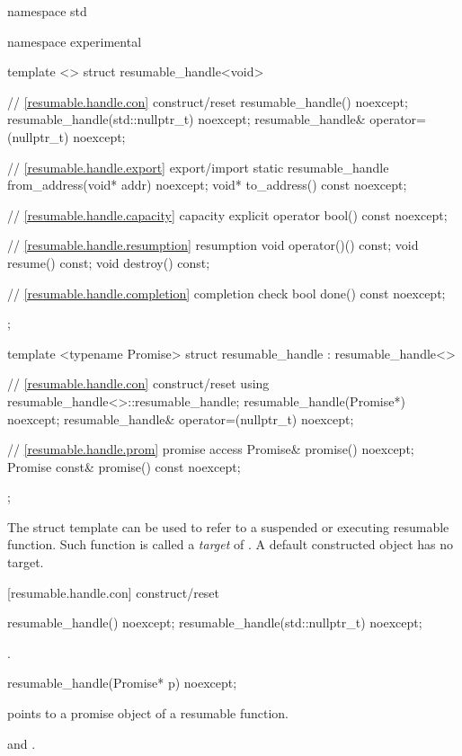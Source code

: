 %
\begin{codeblock}
namespace std {
  namespace experimental {
    template <>
    struct resumable_handle<void>
    {
      // \ref{resumable.handle.con} construct/reset
      resumable_handle() noexcept;		
      resumable_handle(std::nullptr_t) noexcept;
      resumable_handle& operator=(nullptr_t) noexcept;
      
      // \ref{resumable.handle.export} export/import
      static resumable_handle from_address(void* addr) noexcept;		
      void* to_address() const noexcept;
      
      // \ref{resumable.handle.capacity} capacity
      explicit operator bool() const noexcept;
      
      // \ref{resumable.handle.resumption} resumption
      void operator()() const;
      void resume() const;	
      void destroy() const;
      
      // \ref{resumable.handle.completion} completion check
      bool done() const noexcept; 
    };
    
    template <typename Promise>
    struct resumable_handle : resumable_handle<>
    {
      // \ref{resumable.handle.con} construct/reset
      using resumable_handle<>::resumable_handle;
      resumable_handle(Promise*) noexcept;		
      resumable_handle& operator=(nullptr_t) noexcept;
      
      // \ref{resumable.handle.prom} promise access
      Promise& promise() noexcept;		
      Promise const& promise() const noexcept;
    };
  }
}
\end{codeblock}

\pnum
The struct template 
can be used to refer to a suspended or executing resumable function.
Such function is called a \textit{target} of .
A default constructed  object has no target.


[resumable.handle.con]{ construct/reset}
\begin{itemdecl}
  resumable_handle() noexcept;		
  resumable_handle(std::nullptr_t) noexcept;
\end{itemdecl}
\begin{itemdescr}
  \pnum\postconditions {}.
\end{itemdescr}

\begin{itemdecl}
  resumable_handle(Promise* p) noexcept;	
\end{itemdecl}
\begin{itemdescr}
  \pnum
  \precondition {} points to a promise object of a resumable function.
  
	\pnum
  \postconditions {} and .
\end{itemdescr}


